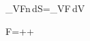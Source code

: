 \oiint_{\partial V}\mathbf F\cdot\mathbf n\,dS=\iiint_V\nabla\cdot\mathbf F\,dV

\nabla\cdot\mathbf F=++
